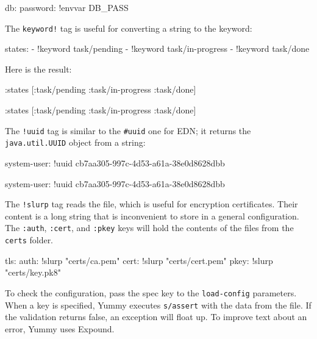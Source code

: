 
\begin{yaml}
db:
  password: !envvar DB_PASS
\end{yaml}

\noindent
The \verb|keyword!| tag is useful for converting a string to the keyword:

\begin{yaml}
states:
  - !keyword task/pending
  - !keyword task/in-progress
  - !keyword task/done
\end{yaml}

\noindent
Here is the result:

\ifnarrow

\begin{clojure}
{:states [:task/pending
          :task/in-progress
          :task/done]}
\end{clojure}

\else

\begin{clojure}
{:states [:task/pending :task/in-progress :task/done]}
\end{clojure}

\fi

The \verb|!uuid| tag is similar to the \verb|#uuid| one for EDN; it returns the \verb|java.util.UUID| object from a string:

\ifnarrow

\begin{yaml}
system-user: !uuid
    cb7aa305-997c-4d53-a61a-38e0d8628dbb
\end{yaml}

\else

\begin{yaml}
system-user: !uuid cb7aa305-997c-4d53-a61a-38e0d8628dbb
\end{yaml}

\fi

The \verb|!slurp| tag reads the file, which is useful for encryption certificates. Their content is a long string that is inconvenient to store in a general configuration. The \verb|:auth|, \verb|:cert|, and \verb|:pkey| keys will hold the contents of the files from the \verb|certs| folder.

\begin{yaml}
tls:
  auth: !slurp "certs/ca.pem"
  cert: !slurp "certs/cert.pem"
  pkey: !slurp "certs/key.pk8"
\end{yaml}


To check the configuration, pass the spec key to the \verb|load-config| parameters. When a key is specified, Yummy executes \verb|s/assert| with the data from the file. If the validation returns false, an exception will float up. To improve text about an error, Yummy uses Expound.

